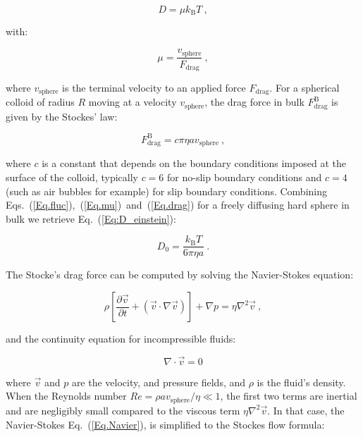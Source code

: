 \begin{equation}
	D = \mu k_\mathrm{B}T ~,
	\label{Eq.fluc}
\end{equation}

with:

\begin{equation}
	\mu = \frac{v_\mathrm{sphere}}{F_\mathrm{drag}} ~,
	\label{Eq.mu}
\end{equation}

where $v_\mathrm{sphere}$ is the terminal velocity to an applied force $F_\mathrm{drag}$. For a spherical colloid of radius $R$ moving at a velocity $v_\mathrm{sphere}$, the drag force in bulk $F_{\mathrm{drag}} ^\mathrm{B}$ is given by the Stockes' law:

\begin{equation}
	F_\mathrm{drag} ^\mathrm{B} = c \pi \eta a v_\mathrm{sphere} ~,
	\label{Eq.drag}
\end{equation}

where $c$ is a constant that depends on the boundary conditions imposed at the surface of the colloid, typically $c = 6$ for no-slip boundary conditions  and $c = 4$ (such as air bubbles for example) for slip boundary conditions. Combining Eqs.~(\ref{Eq.fluc}),~(\ref{Eq.mu})~and~(\ref{Eq.drag}) for a freely diffusing hard sphere in bulk we retrieve Eq.~(\ref{Eq:D_einstein}): 

\begin{equation}
	D_0 = \frac{k_\mathrm{B}T}{6\pi \eta a} ~.
	\label{Eq.D}
\end{equation}

The Stocke's drag force can be computed by solving the Navier-Stokes equation:

\begin{equation}
	\rho \left[ \frac{\partial \vec{v}}{\partial t} + \left(\vec{v} \cdot \nabla \vec{v} \right) \right] + \nabla p = \eta \nabla ^2 \vec{v} ~,
	\label{Eq.Navier}
\end{equation}

and the continuity equation for incompressible fluids:

\begin{equation}
	\nabla \cdot \vec{v} = 0
	\label{Eq.continuity}
\end{equation}

where $\vec{v}$ and $p$ are the velocity, and pressure fields, and $\rho$ is the fluid's density. When the Reynolds number $Re = \rho a v_\mathrm{sphere} / \eta \ll 1$,  the first two terms are inertial and are negligibly small compared to the viscous term $\eta \nabla ^2 \vec{v}$. In that case, the Navier-Stokes Eq.~(\ref{Eq.Navier}), is simplified to the Stockes flow formula:

